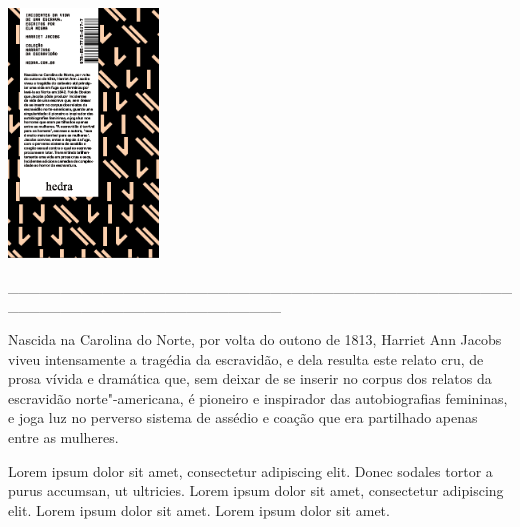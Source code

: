 \pagebreak

\hspace{.5cm}

\begin{center}
\hspace*{-.5cm}\includegraphics[width=40mm]{./imgs/jacobs.png}
\end{center}

\hspace*{-2cm}\_\_\_\_\_\_\_\_\_\_\_\_\_\_\_\_\_\_\_\_\_\_\_\_\_\_\_\_\_\_\_\_\_\_\_\_\_\_\_\_\_\_\_\_\_\_\_\_\_\_\_\_\_\_\_\_\_\_\_\_\_\_\_\_\_\_\_\_\_\_\_\_\_\_

\medskip

\noindent{}Nascida na Carolina do Norte, por volta do outono de 1813, Harriet Ann Jacobs viveu intensamente a tragédia da escravidão, e dela resulta este relato cru, de prosa vívida e dramática que, sem deixar de se inserir no corpus dos relatos da escravidão norte"-americana, é pioneiro e inspirador das autobiografias femininas, e joga luz no perverso sistema de assédio e coação que era partilhado apenas entre as mulheres.

\hspace{.5cm}

\hspace*{-.4cm}\begin{minipage}[c]{0.45\linewidth}
\small{
{}}
\end{minipage}
\begin{minipage}[c]{0.50\linewidth}
\small{Lorem ipsum dolor sit amet, consectetur adipiscing elit.
Donec sodales tortor a purus accumsan, ut ultricies. Lorem ipsum dolor sit amet, consectetur adipiscing elit. Lorem ipsum dolor sit amet. Lorem ipsum dolor sit amet.} 
\end{minipage}

